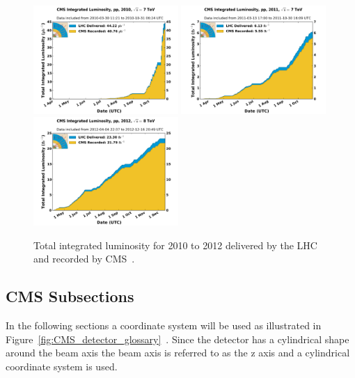 \begin{figure}[htb]
\centering
\includegraphics[width=0.49\textwidth]{Experiment/int_lumi_per_day_cumulative_pp_2010.pdf}
\includegraphics[width=0.49\textwidth]{Experiment/int_lumi_per_day_cumulative_pp_2011.pdf}
\includegraphics[width=0.49\textwidth]{Experiment/int_lumi_per_day_cumulative_pp_2012.pdf}
\caption{Total integrated luminosity for 2010 to 2012 delivered by the LHC and recorded by CMS~\cite{cms_lumi_plots}.}
\label{fig:CMS_luminosity}
\end{figure}

\subsection{CMS Subsections}
In the following sections a coordinate system will be used as illustrated in Figure~\ref{fig:CMS_detector_glossary}~\cite{Pandolfi_talk}.  Since the detector has a cylindrical shape around the beam axis the beam axis is referred to as the z axis and a cylindrical coordinate system is used.

